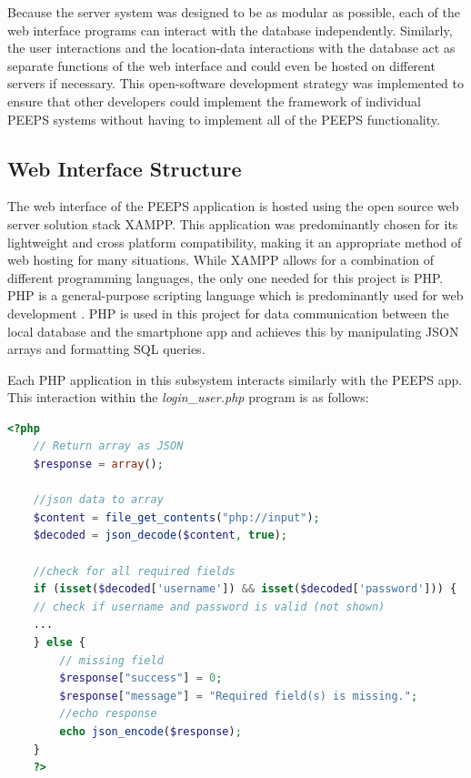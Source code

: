 Because the server system was designed to be as modular as possible, each of the web interface programs can interact with the database independently. Similarly, the user interactions and the location-data interactions with the database act as separate functions of the web interface and could even be hosted on different servers if necessary. This open-software development strategy was implemented to ensure that other developers could implement the framework of individual PEEPS systems without having to implement all of the PEEPS functionality.

\subsection{Web Interface Structure}
\label{sec:web_interface}
The web interface of the PEEPS application is hosted using the open source web server solution stack XAMPP. This application was predominantly chosen for its lightweight and cross platform compatibility, making it an appropriate method of web hosting for many situations. While XAMPP allows for a combination of different programming languages, the only one needed for this project is PHP. PHP is a general-purpose scripting language which is predominantly used for web development \cite{ThePHPGroup}. PHP is used in this project for data communication between the local database and the smartphone app and achieves this by manipulating JSON arrays and formatting SQL queries. 

Each PHP application in this subsystem interacts similarly with the PEEPS app. This interaction within the \textit{login\_user.php} program is as follows:

\lstset{style=phpstyle}
\begin{lstlisting}[caption={\detokenize{How login_user.php interacts with the smartphone app.}},label={lst:php_login},language=php]
    <?php
    // Return array as JSON
    $response = array();

    //json data to array
    $content = file_get_contents("php://input");
    $decoded = json_decode($content, true);

    //check for all required fields
    if (isset($decoded['username']) && isset($decoded['password'])) {
    // check if username and password is valid (not shown)
    ... 
    } else {
        // missing field
        $response["success"] = 0;
        $response["message"] = "Required field(s) is missing.";
        //echo response
        echo json_encode($response);
    }
    ?>    
\end{lstlisting}


